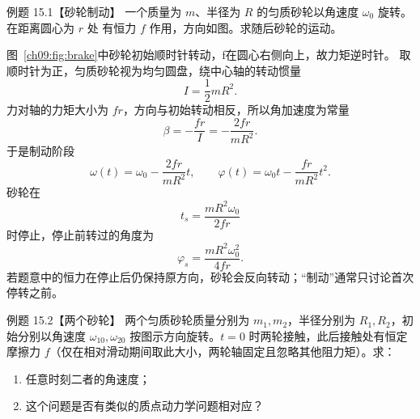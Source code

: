 

\Needspace{0.34\textheight}
\begin{origexamplebox}{例题 15.1【砂轮制动】}
一个质量为 $m$、半径为 $R$ 的匀质砂轮以角速度 $\omega_0$ 旋转。在距离圆心为 $r$ 处
有恒力 $f$ 作用，方向如图。求随后砂轮的运动。
\brakeWheelDiagram
\end{origexamplebox}

\begin{xesolution}
图~\ref{ch09:fig:brake}中砂轮初始顺时针转动，f在圆心右侧向上，故力矩逆时针。
取顺时针为正，匀质砂轮视为均匀圆盘，绕中心轴的转动惯量
\[
 I=\frac12mR^2.
\]
力对轴的力矩大小为 $fr$，方向与初始转动相反，所以角加速度为常量
\[
 \beta=-\frac{fr}{I}=-\frac{2fr}{mR^2}.
\]
于是制动阶段
\[
 \boxed{\omega(t)=\omega_0-\frac{2fr}{mR^2}t},
 \qquad
 \boxed{\varphi(t)=\omega_0t-\frac{fr}{mR^2}t^2}.
\]
砂轮在
\[
 \boxed{t_s=\frac{mR^2\omega_0}{2fr}}
\]
时停止，停止前转过的角度为
\[
 \boxed{\varphi_s=\frac{mR^2\omega_0^2}{4fr}}.
\]
若题意中的恒力在停止后仍保持原方向，砂轮会反向转动；“制动”通常只讨论首次停转之前。
\end{xesolution}

\Needspace{0.37\textheight}
\begin{origexamplebox}{例题 15.2【两个砂轮】}
两个匀质砂轮质量分别为 $m_1,m_2$，半径分别为 $R_1,R_2$，初始分别以角速度
$\omega_{10},\omega_{20}$ 按图示方向旋转。$t=0$ 时两轮接触，此后接触处有恒定摩擦力
$f$（仅在相对滑动期间取此大小，两轮轴固定且忽略其他阻力矩）。求：
\begin{enumerate}[label=(\arabic*),leftmargin=2.2em]
  \item 任意时刻二者的角速度；
  \item 这个问题是否有类似的质点动力学问题相对应？
\end{enumerate}
\twoWheelsDiagram
\end{origexamplebox}

